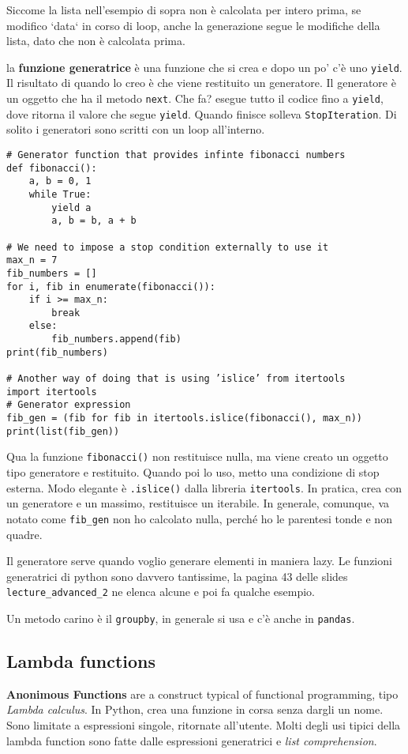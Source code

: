 \documentclass[10pt, a4paper, titlepage]{book}
\begin{document}
Siccome la lista nell'esempio di sopra non è calcolata per intero prima, se modifico `data` in corso di loop, anche la generazione segue le modifiche della lista, dato che non è calcolata prima.

la \textbf{funzione generatrice} è una funzione che si crea e dopo un po' c'è uno \texttt{yield}. Il risultato di quando lo creo è che viene restituito un generatore. 
Il generatore è un oggetto che ha il metodo \texttt{next}. Che fa? esegue tutto il codice fino a \texttt{yield}, dove ritorna il valore che segue \texttt{yield}. Quando finisce solleva \texttt{StopIteration}.
Di solito i generatori sono scritti con un loop all'interno.

\begin{verbatim}
# Generator function that provides infinte fibonacci numbers
def fibonacci():
	a, b = 0, 1
	while True:
		yield a
		a, b = b, a + b

# We need to impose a stop condition externally to use it
max_n = 7
fib_numbers = []
for i, fib in enumerate(fibonacci()):
	if i >= max_n:
		break
	else:
		fib_numbers.append(fib)
print(fib_numbers)

# Another way of doing that is using ’islice’ from itertools
import itertools
# Generator expression
fib_gen = (fib for fib in itertools.islice(fibonacci(), max_n))
print(list(fib_gen))
\end{verbatim}

Qua la funzione \texttt{fibonacci()} non restituisce nulla, ma viene creato un oggetto tipo generatore e restituito. Quando poi lo uso, metto una condizione di stop esterna.
Modo elegante è \texttt{.islice()} dalla libreria \texttt{itertools}. In pratica, crea con un generatore e un massimo, restituisce un iterabile. In generale, comunque, va notato come \texttt{fib_gen} non ho calcolato nulla, perché ho le parentesi tonde e non quadre.

Il generatore serve quando voglio generare elementi in maniera lazy.
Le funzioni generatrici di python sono davvero tantissime, la pagina 43 delle slides \texttt{lecture\_advanced\_2} ne elenca alcune e poi fa qualche esempio.

Un metodo carino è il \texttt{groupby}, in generale si usa e c'è anche in \texttt{pandas}.

\subsection{Lambda functions}

\textbf{Anonimous Functions} are a construct typical of functional programming, tipo \textit{Lambda calculus}.
In Python, crea una funzione in corsa senza dargli un nome. Sono limitate a espressioni singole, ritornate all'utente. Molti degli usi tipici della lambda function sono fatte dalle espressioni generatrici e \textit{list comprehension}.
\end{document}
